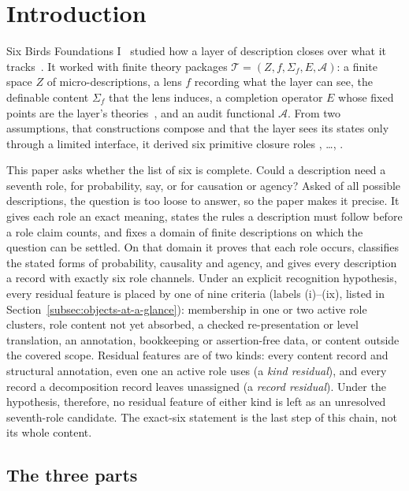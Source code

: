 \section{Introduction}\label{sec:introduction}


Six Birds Foundations I~\citep{Tsiokos2026SixBirdsFoundations} studied
how a layer of description closes over what it
tracks~\citep{Anderson1972}. It worked with finite theory packages
\(\mathcal{T} = (Z, f, \Sigma_f, E, \mathcal{A})\): a finite space \(Z\)
of micro-descriptions, a lens \(f\) recording what the layer can see,
the definable content \(\Sigma_f\) that the lens induces, a completion
operator \(E\) whose fixed points are the layer's
theories~\citep{DaveyPriestley2002}, and an audit functional
\(\mathcal{A}\). From two assumptions, that constructions compose and
that the layer sees its states only through a limited interface, it
derived six primitive closure roles \Pone{}, \ldots, \Psix{}.

This paper asks whether the list of six is complete. Could a
description need a seventh role, for probability, say, or for causation
or agency? Asked of all possible descriptions, the question is too
loose to answer, so the paper makes it precise. It gives each role an
exact meaning, states the rules a description must follow before a
role claim counts, and fixes a domain of finite descriptions on which
the question can be settled. On that domain it proves that each role
occurs, classifies the stated forms of probability, causality and
agency, and gives every description a record with exactly six role
channels. Under an explicit recognition hypothesis, every residual feature is placed by
one of nine criteria (labels (i)--(ix), listed in
Section~\ref{subsec:objects-at-a-glance}): membership in one or two active role clusters,
role content not yet absorbed, a checked re-presentation or level translation, an annotation,
bookkeeping or assertion-free data, or content outside the covered
scope. Residual features are of two kinds: every content record and
structural annotation, even one an active role uses (a \emph{kind residual}),
and every record a decomposition record leaves unassigned (a \emph{record
residual}). Under the hypothesis, therefore, no residual feature of either kind is left as
an unresolved seventh-role candidate. The exact-six statement is the
last step of this chain, not its whole content.

\subsection{The three parts}\label{subsec:three-pillars}


